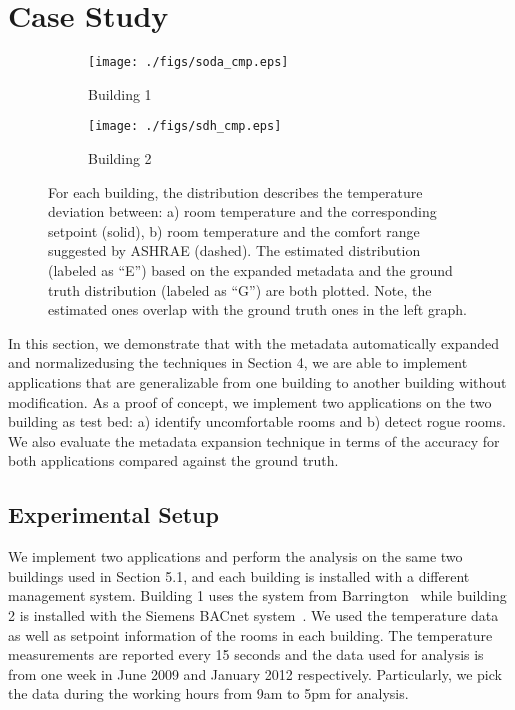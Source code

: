 \section{Case Study}

\begin{figure*}[ht!]
\centering
	\begin{subfigure}{0.40\textwidth}
                \centering
		\texttt{[image: ./figs/soda\_cmp.eps]}
                \caption{Building 1}
	\end{subfigure}
	\begin{subfigure}{0.40\textwidth}
                \centering
		\texttt{[image: ./figs/sdh\_cmp.eps]}
                \caption{Building 2}
	\end{subfigure}
\caption{For each building, the distribution describes the temperature deviation between: a) room temperature and the corresponding setpoint (solid), b) room temperature and the comfort range suggested by ASHRAE (dashed). The estimated distribution (labeled as ``E'') based on the expanded metadata and the ground truth distribution (labeled as ``G'') are both plotted. Note, the estimated ones overlap with the ground truth ones in the left graph.}
\label{fig:cdf_temp}
\end{figure*}

In this section, we demonstrate that with the metadata automatically expanded and normalizedusing the techniques in Section 4, we are able to implement applications that are generalizable from one building to another building without modification. As a proof of concept, we implement two applications on the two building as test bed: a) identify uncomfortable rooms and b) detect rogue rooms. We also evaluate the metadata expansion technique in terms of the accuracy for both applications compared against the ground truth. 

\subsection{Experimental Setup}
We implement two applications and perform the analysis on the same two buildings used in Section 5.1, and each building is installed with a different management system. Building 1 uses the system from Barrington~\cite{1} while building 2 is installed with the Siemens BACnet system~\cite{bacnet}. We used the temperature data as well as setpoint information of the rooms in each building. The temperature measurements are reported every 15 seconds and the data used for analysis is from one week in June 2009 and January 2012 respectively. Particularly, we pick the data during the working hours from 9am to 5pm for analysis.

